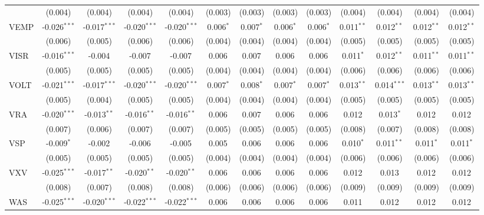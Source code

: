 \begin{table}[!htbp]
\begin{tabular}{@{\extracolsep{5pt}}lcccccccccccc}
  & (0.004) & (0.004) & (0.004) & (0.004) & (0.003) & (0.003) & (0.003) & (0.003) & (0.004) & (0.004) & (0.004) & (0.004) \\
 VEMP & -0.026$^{***}$ & -0.017$^{***}$ & -0.020$^{***}$ & -0.020$^{***}$ & 0.006$^{*}$ & 0.007$^{*}$ & 0.006$^{*}$ & 0.006$^{*}$ & 0.011$^{**}$ & 0.012$^{**}$ & 0.012$^{**}$ & 0.012$^{**}$ \\
  & (0.006) & (0.005) & (0.006) & (0.006) & (0.004) & (0.004) & (0.004) & (0.004) & (0.005) & (0.005) & (0.005) & (0.005) \\
 VISR & -0.016$^{***}$ & -0.004$^{}$ & -0.007$^{}$ & -0.007$^{}$ & 0.006$^{}$ & 0.007$^{}$ & 0.006$^{}$ & 0.006$^{}$ & 0.011$^{*}$ & 0.012$^{**}$ & 0.011$^{**}$ & 0.011$^{**}$ \\
  & (0.005) & (0.005) & (0.005) & (0.005) & (0.004) & (0.004) & (0.004) & (0.004) & (0.006) & (0.006) & (0.006) & (0.006) \\
 VOLT & -0.021$^{***}$ & -0.017$^{***}$ & -0.020$^{***}$ & -0.020$^{***}$ & 0.007$^{*}$ & 0.008$^{*}$ & 0.007$^{*}$ & 0.007$^{*}$ & 0.013$^{**}$ & 0.014$^{***}$ & 0.013$^{**}$ & 0.013$^{**}$ \\
  & (0.005) & (0.004) & (0.005) & (0.005) & (0.004) & (0.004) & (0.004) & (0.004) & (0.005) & (0.005) & (0.005) & (0.005) \\
 VRA & -0.020$^{***}$ & -0.013$^{**}$ & -0.016$^{**}$ & -0.016$^{**}$ & 0.006$^{}$ & 0.007$^{}$ & 0.006$^{}$ & 0.006$^{}$ & 0.012$^{}$ & 0.013$^{*}$ & 0.012$^{}$ & 0.012$^{}$ \\
  & (0.007) & (0.006) & (0.007) & (0.007) & (0.005) & (0.005) & (0.005) & (0.005) & (0.008) & (0.007) & (0.008) & (0.008) \\
 VSP & -0.009$^{*}$ & -0.002$^{}$ & -0.006$^{}$ & -0.005$^{}$ & 0.005$^{}$ & 0.006$^{}$ & 0.006$^{}$ & 0.006$^{}$ & 0.010$^{*}$ & 0.011$^{**}$ & 0.011$^{*}$ & 0.011$^{*}$ \\
  & (0.005) & (0.005) & (0.005) & (0.005) & (0.004) & (0.004) & (0.004) & (0.004) & (0.006) & (0.006) & (0.006) & (0.006) \\
 VXV & -0.025$^{***}$ & -0.017$^{**}$ & -0.020$^{**}$ & -0.020$^{**}$ & 0.006$^{}$ & 0.006$^{}$ & 0.006$^{}$ & 0.006$^{}$ & 0.012$^{}$ & 0.013$^{}$ & 0.012$^{}$ & 0.012$^{}$ \\
  & (0.008) & (0.007) & (0.008) & (0.008) & (0.006) & (0.006) & (0.006) & (0.006) & (0.009) & (0.009) & (0.009) & (0.009) \\
 WAS & -0.025$^{***}$ & -0.020$^{***}$ & -0.022$^{***}$ & -0.022$^{***}$ & 0.006$^{}$ & 0.006$^{}$ & 0.006$^{}$ & 0.006$^{}$ & 0.011$^{}$ & 0.012$^{}$ & 0.012$^{}$ & 0.012$^{}$ \\

\end{tabular}
\end{table}
